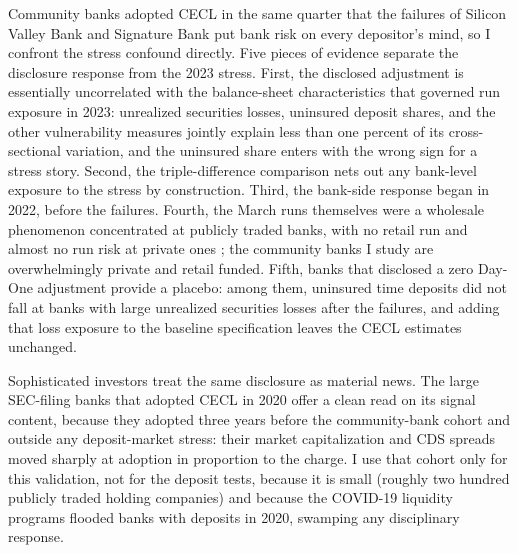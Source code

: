 Community banks adopted CECL in the same quarter that the failures of
Silicon Valley Bank and Signature Bank put bank risk on every
depositor's mind, so I confront the stress confound directly.  Five
pieces of evidence separate the disclosure response from the 2023
stress.  First, the disclosed adjustment is essentially uncorrelated
with the balance-sheet characteristics that governed run exposure in
2023: unrealized securities losses, uninsured deposit shares, and the
other vulnerability measures jointly explain less than one percent of
its cross-sectional variation, and the uninsured share enters with the
wrong sign for a stress story.  Second, the triple-difference
comparison nets out any bank-level exposure to the stress by
construction.  Third, the
bank-side response began in 2022, before the failures.  Fourth, the
March runs themselves were a wholesale phenomenon concentrated at
publicly traded banks, with no retail run and almost no run risk at
private ones \citep{cipriani2024tracing}; the community banks I study
are overwhelmingly private and retail funded.  Fifth, banks that
disclosed a zero Day-One adjustment provide a placebo: among them,
uninsured time deposits did not fall at banks with large unrealized
securities losses after the failures, and adding that loss exposure to
the baseline specification leaves the CECL estimates unchanged.

Sophisticated investors treat the same disclosure as material news.
The large SEC-filing banks that adopted CECL in 2020 offer a clean
read on its signal content, because they adopted three years before
the community-bank cohort and outside any deposit-market stress: their
market capitalization and CDS spreads moved sharply at adoption in
proportion to the charge.  I
use that cohort only for this validation, not for the deposit tests,
because it is small
(roughly two hundred publicly traded holding companies) and because
the COVID-19 liquidity programs flooded banks with deposits in
2020, swamping any disciplinary response.

